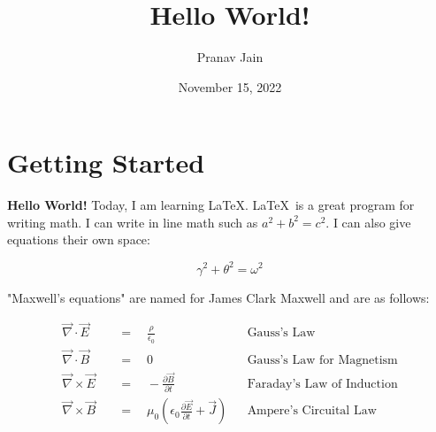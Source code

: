 \documentclass{article}
\title{Hello World!}
\date{November 15, 2022}
\author{Pranav Jain}
\begin{document}
    \maketitle
    \thispagestyle{empty}
    \section{Getting Started}

    \noindent\textbf{Hello World!}
    Today, I am learning \LaTeX. \LaTeX\ is a great program for writing
    math. I can write in line math such as $ a^2+b^2=c^2 $. I can also give equations
    their own space:

    \begin{equation}
        \gamma^2+\theta^2=\omega^2 \label{eq:Pythagoras}
    \end{equation}

    \noindent
    "Maxwell's equations" are named for James Clark Maxwell and are as follows:

    \begin{align}
        \vec{\nabla} \cdot \vec{E} \quad &= 
        \quad\frac{\rho}{\epsilon_0} &&
        \text{Gauss's Law} 
        \label{eq:Gauss} \\
        \vec{\nabla} \cdot \vec{B} \quad &= 
        \quad 0 &&
        \text{Gauss's Law for Magnetism} 
        \label{eq:GaussMag} \\
        \vec{\nabla} \times \vec{E} \quad &= 
        \quad-\frac{\partial{\vec{B}}}{\partial{t}} &&
        \text{Faraday's Law of Induction} 
        \label{eq:Faraday} \\ 
        \vec{\nabla} \times \vec{B} \quad &=
        \quad \mu_0\left( \epsilon_0\frac{\partial{\vec{E}}}{\partial{t}} + \vec{J}\right) &&
        \text{Ampere's Circuital Law} 
        \label{eq:Ampere}
    \end{align}

\end{document}
